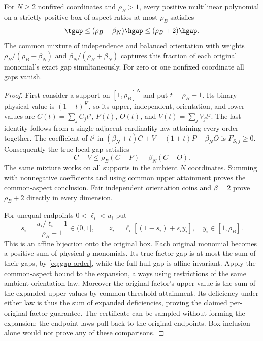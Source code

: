 \begin{theorem}\label{thm:positive-box-upper}
For $N\ge2$ nonfixed coordinates and $\rho_B>1$, every positive
multilinear polynomial on a strictly positive box of aspect ratios at
most $\rho_B$ satisfies
\[
 \tgap\le(\rho_B+\beta_N)\hgap\le(\rho_B+2)\hgap.
\]
The common mixture of independence and balanced orientation with weights
$\rho_B/(\rho_B+\beta_N)$ and $\beta_N/(\rho_B+\beta_N)$ captures this
fraction of each original monomial's exact gap simultaneously. For zero
or one nonfixed coordinate all gaps vanish.
\end{theorem}
\begin{proof}
First consider a support on $[1,\rho_B]^N$ and put $t=\rho_B-1$.
Its binary physical value is $(1+t)^K$, so its upper, independent,
orientation, and lower values are $C(t)=\sum_jC_jt^j$, $P(t)$,
$O(t)$, and $V(t)=\sum_jV_jt^j$. The last identity follows from a
single adjacent-cardinality law attaining every order together.
The coefficient of $t^j$ in
$(\beta_N+t)C+V-(1+t)P-\beta_NO$ is $F_{S,j}\ge0$.
Consequently the true local gap satisfies
\begin{equation}\label{eq:physical-local}
 C-V\le\rho_B(C-P)+\beta_N(C-O).
\end{equation}
The same mixture works on all supports in the ambient $N$ coordinates.
Summing with nonnegative coefficients and using common upper attainment
proves the common-aspect conclusion. Fair independent orientation coins
and $\beta=2$ prove $\rho_B+2$ directly in every dimension.

For unequal endpoints $0<\ell_i<u_i$ put
\[
 s_i=\frac{u_i/\ell_i-1}{\rho_B-1}\in(0,1],\qquad
 z_i=\ell_i[(1-s_i)+s_i y_i],\quad y_i\in[1,\rho_B].
\]
This is an affine bijection onto the original box. Each original
monomial becomes a positive sum of physical $y$-monomials. Its true
factor gap is at most the sum of their gaps, by
\eqref{eq:gap-order}, while the full hull gap is affine invariant.
Apply the common-aspect bound to the expansion, always using restrictions
of the same ambient orientation law. Moreover the original factor's
upper value is the sum of the expanded upper values by common-threshold
attainment. Its deficiency under either law is thus the sum of expanded
deficiencies, proving the claimed per-original-factor guarantee.
The certificate can be sampled without forming the expansion: the
endpoint laws pull back to the original endpoints. Box inclusion alone
would not prove any of these comparisons.
\end{proof}

